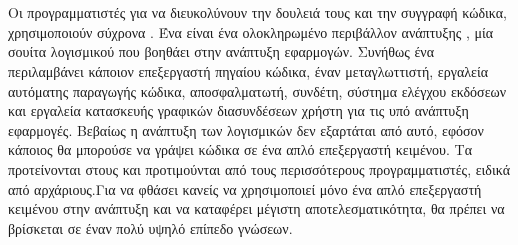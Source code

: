 \section{}
\quad Οι προγραμματιστές για να διευκολύνουν την δουλειά τους και την συγγραφή κώδικα, χρησιμοποιούν σύχρονα . Ένα  είναι ένα ολοκληρωμένο περιβάλλον ανάπτυξης , μία σουίτα λογισμικού που βοηθάει στην ανάπτυξη εφαρμογών. Συνήθως ένα  περιλαμβάνει κάποιον επεξεργαστή πηγαίου κώδικα, έναν μεταγλωττιστή, εργαλεία αυτόματης παραγωγής κώδικα, αποσφαλματωτή, συνδέτη, σύστημα ελέγχου εκδόσεων και εργαλεία κατασκευής γραφικών διασυνδέσεων χρήστη για τις υπό ανάπτυξη εφαρμογές. Βεβαίως η ανάπτυξη των λογισμικών δεν εξαρτάται από αυτό, εφόσον κάποιος θα μπορούσε να γράψει κώδικα σε ένα απλό επεξεργαστή κειμένου. Τα  προτείνονται στους και προτιμούνται από τους περισσότερους προγραμματιστές, ειδικά από αρχάριους.Για να φθάσει κανείς να χρησιμοποιεί μόνο ένα απλό επεξεργαστή κειμένου στην ανάπτυξη και να καταφέρει μέγιστη αποτελεσματικότητα, θα πρέπει να βρίσκεται σε έναν πολύ υψηλό επίπεδο γνώσεων.\newline

